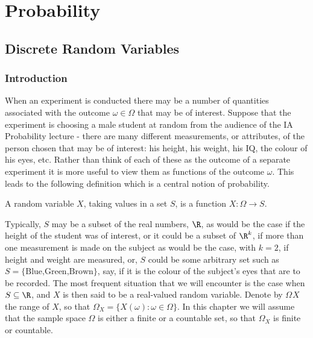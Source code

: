 

\chapter{Probability}



\section{Discrete Random Variables}

\subsection{Introduction}

When an experiment is conducted there may be a number of quantities associated with the outcome $\omega\in\Omega$­ that may be of interest. Suppose that the experiment is choosing a male student at random from the audience of the IA Probability lecture - there are many different measurements, or attributes, of the person chosen that may be of interest: his height, his weight, his IQ, the colour of his eyes, etc. Rather than think of each of these as the outcome of a separate experiment it is more useful to view them as functions of the outcome $\omega$. This leads to the following definition which is a central notion of probability.

\begin{definition}
A random variable $X$, taking values in a set $S$, is a function $X : \Omega \to S$.
\end{definition}

Typically, $S$ may be a subset of the real numbers, $\R$, as would be the case if the height of the student was of interest, or it could be a subset of $\R^k$, if more than one measurement is made on the subject as would be the case, with $k = 2$, if height and weight are measured, or, $S$ could be some arbitrary set such as $S = \{\text{Blue,Green,Brown}\}$, say, if it is the colour of the subject's eyes that are to be recorded. The most frequent situation that we will encounter is the case when $S \subseteq \R$, and $X$ is then said to be a real-valued random variable. Denote by $\Omega_­X$ the range of $X$, so that ­$\Omega_X = \{X(\omega) : \omega\in\Omega\}$. In this chapter we will assume that the sample space ­$\Omega$ is either a finite or a countable set, so that $\Omega_X$ is finite or countable.

